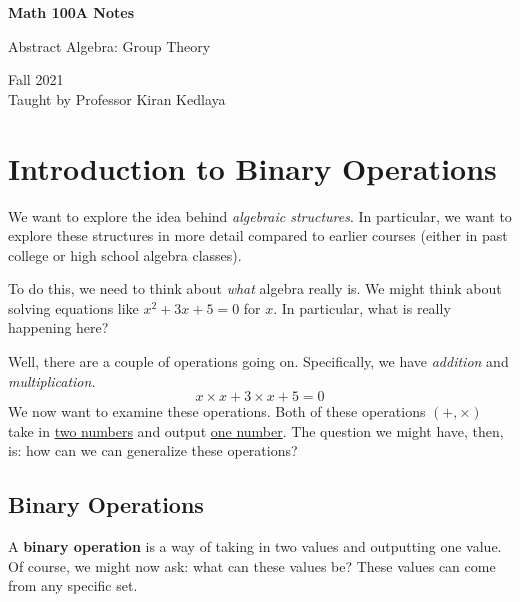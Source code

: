 \documentclass[letterpaper]{article}
\begin{document}
\begin{titlepage}
    \begin{center}
        \vspace*{1cm}
            
        \Huge
        \textbf{Math 100A Notes}
            
        \vspace{0.5cm}
        \LARGE
        Abstract Algebra: Group Theory
            
        \vspace{1.5cm}
            
        \vfill
            
        Fall 2021\\
        Taught by Professor Kiran Kedlaya
    \end{center}
\end{titlepage}


\newpage 

\begingroup
    \renewcommand\contentsname{Table of Contents}
    \tableofcontents
\endgroup

\newpage
{}

\section{Introduction to Binary Operations}
We want to explore the idea behind \emph{algebraic structures}. In particular, we want to explore these structures in more detail compared to earlier courses (either in past college or high school algebra classes). 


\bigskip 

To do this, we need to think about \emph{what} algebra really is. We might think about solving equations like $x^2 + 3x + 5 = 0$ for $x$. In particular, what is really happening here?

\bigskip 

Well, there are a couple of operations going on. Specifically, we have \emph{addition} and \emph{multiplication}. 
\[x \times x + 3 \times x + 5 = 0\]
We now want to examine these operations. Both of these operations $(+, \times)$ take in \underline{two numbers} and output \underline{one number}. The question we might have, then, is: how can we can generalize these operations?


\subsection{Binary Operations}
A \textbf{binary operation} is a way of taking in two values and outputting one value. Of course, we might now ask: what can these values be? These values can come from any specific set. 
\end{document}
